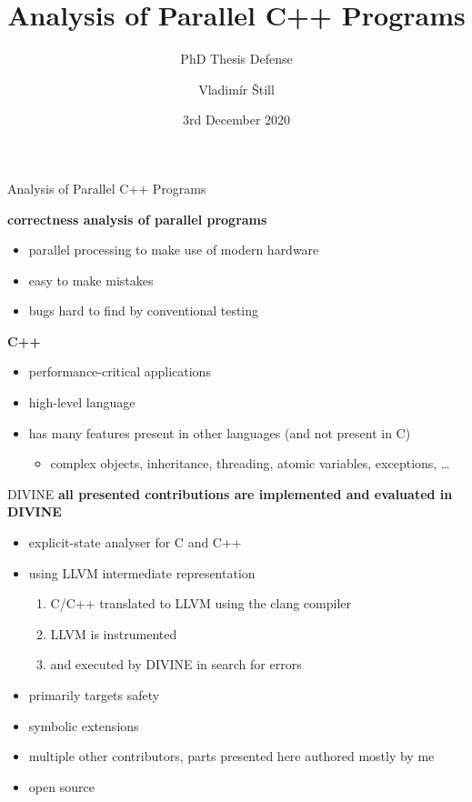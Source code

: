 \documentclass[aspectratio=169, fi]{paradise-slide}
\title{Analysis of Parallel C++ Programs}
\subtitle{PhD Thesis Defense}
\author{Vladimír Štill}
\date{3rd December 2020}
\begin{document}

\begin{frame}{Analysis of Parallel C++ Programs}

\textbf{correctness analysis of parallel programs}
\begin{itemize}
    \item parallel processing to make use of modern hardware
    \item easy to make mistakes
    \item bugs hard to find by conventional testing
\end{itemize}
\pause

\bigskip
\textbf{C++}
\begin{itemize}
  \item performance-critical applications
  \item high-level language
  \item has many features present in other languages (and not present in C)
    \begin{itemize}
      \item complex objects, inheritance, threading, atomic variables, exceptions, …
    \end{itemize}
\end{itemize}
\end{frame}

\begin{frame}{DIVINE}
  \textbf{all presented contributions are implemented and evaluated in DIVINE}

  \begin{itemize}
    \item explicit-state analyser for C and C++
    \item using LLVM intermediate representation
      \begin{enumerate}
        \item C/C++ translated to LLVM using the clang compiler
        \item LLVM is instrumented
        \item and executed by DIVINE in search for errors
      \end{enumerate}\pause

    \item primarily targets safety
    \item symbolic extensions
    \item multiple other contributors, parts presented here authored mostly by me
    \item open source
  \end{itemize}
\end{frame}
\end{document}
